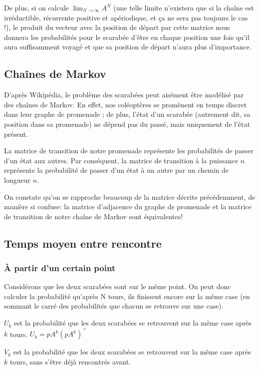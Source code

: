 \documentclass{scrartcl}
\begin{document}
  De plus, si on calcule $\lim_{N \to \infty} A^N$ (une telle limite n'existera
  que si la chaîne est irréductible, récurrente positive et apériodique, et ça
  ne sera pas toujours le cas !), le produit du vecteur avec la position de
  départ par cette matrice nous donnera les probabilités pour le scarabée
  d'être en chaque position une fois qu'il aura suffisamment voyagé et que sa
  position de départ n'aura plus d'importance.

  \subsection{Chaînes de Markov}
    D'après Wikipédia, le problème des scarabées peut aisément être modélisé
    par des chaînes de Markov. En effet, nos coléoptères se promènent en temps
    discret dans leur graphe de promenade ; de plus, l'état d'un scarabée
    (autrement dit, sa position dans sa promenade) ne dépend pas du passé, mais
    uniquement de l'état présent.

    La matrice de transition de notre promenade représente les probabilités de
    passer d'un état aux autres. Par conséquent, la matrice de transition à la
    puissance $n$ représente la probabilité de passer d'un état à un autre par
    un chemin de longueur $n$.

    On constate qu'on se rapproche beaucoup de la matrice décrite précédemment,
    de manière si confuse: la matrice d'adjacence du graphe de promenade et la
    matrice de transition de notre chaîne de Markov sont équivalentes!

  \subsection{Temps moyen entre rencontre}
    \subsubsection{À partir d'un certain point}
      Considérons que les deux scarabées sont sur le même point.  On peut donc
      calculer la probabilité qu'après N tours, ils finissent encore sur la
      même case (en sommant le carré des probabilités que chacun se retrouve
      sur une case).

      $U_k$ est la probabilité que les deux scarabées se retrouvent sur la même
      case après $k$ tours.  $U_k = pA^k(pA^k)^\intercal$

      $V_k$ est la probabilité que les deux scarabées se retrouvent sur la même
      case après $k$ tours, sans s'être déjà rencontrés avant.
\end{document}
